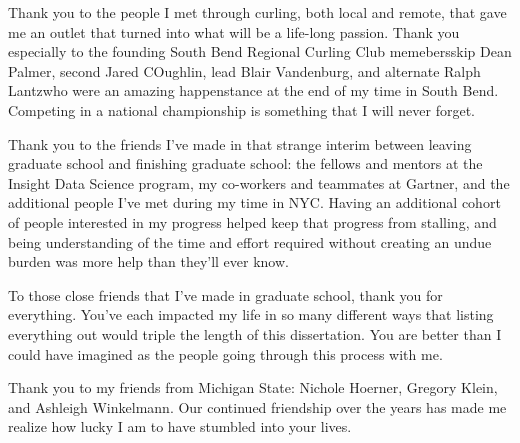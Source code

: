 \begin{acknowledge}
Thank you to the people I met through curling, both local and remote,
that gave me an outlet that turned into what will be a life-long
passion. Thank you especially to the founding South Bend Regional
Curling Club memebers\textemdash{}skip Dean Palmer, second Jared
COughlin, lead Blair Vandenburg, and alternate Ralph
Lantz\textemdash{}who were an amazing happenstance at the end of my time
in South Bend. Competing in a national championship is something that I
will never forget.

Thank you to the friends I've made in that strange interim between
leaving graduate school and finishing graduate school: the fellows and
mentors at the Insight Data Science program, my co-workers and teammates
at Gartner, and the additional people I've met during my time in NYC.
Having an additional cohort of people interested in my progress helped
keep that progress from stalling, and being understanding of the time
and effort required without creating an undue burden was more help than
they'll ever know.

To those close friends that I've made in graduate school, thank you for
everything. You've each impacted my life in so many different ways that
listing everything out would triple the length of this dissertation. You
are better than I could have imagined as the people going through this
process with me.

Thank you to my friends from Michigan State: Nichole Hoerner, Gregory
Klein, and Ashleigh Winkelmann. Our continued friendship over the years
has made me realize how lucky I am to have stumbled into your lives.


\end{acknowledge}
